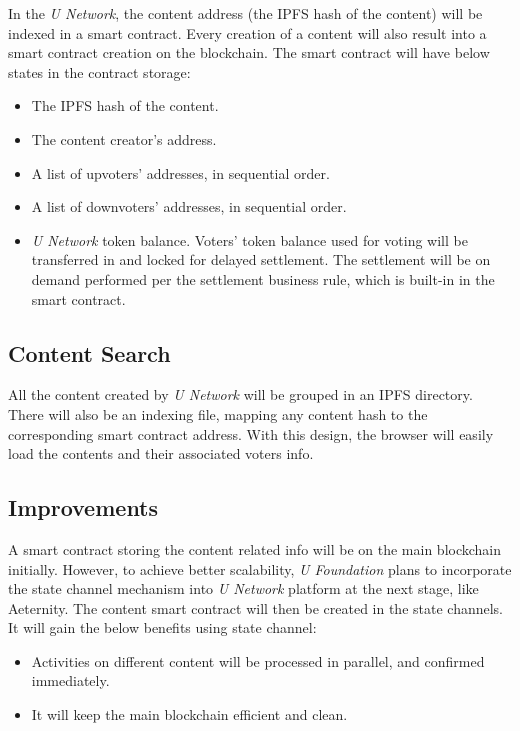 In the \emph{U Network}, the content address (the IPFS hash of the content) will be indexed in a smart contract. Every creation of a content will also result into a smart contract creation on the blockchain. The smart contract will have below states in the contract storage:
\begin{itemize}
\item The IPFS hash of the content.
\item The content creator's address. 
\item A list of upvoters' addresses, in sequential order.
\item A list of downvoters' addresses, in sequential order.
\item \emph{U Network} token balance. Voters' token balance used for voting will be transferred in and locked for delayed settlement. The settlement will be on demand performed per the settlement business rule, which is built-in in the smart contract.
\end{itemize}

\subsection{Content Search}

All the content created by \emph{U Network} will be grouped in an IPFS directory. There will also be an indexing file, mapping any content hash to the corresponding smart contract address. With this design, the browser will easily load the contents and their associated voters info. 

\subsection{Improvements}

A smart contract storing the content related info will be on the main blockchain initially. However, to achieve better scalability, \emph{U Foundation} plans to incorporate the state channel mechanism into \emph{U Network} platform at the next stage, like Aeternity. The content smart contract will then be created in the state channels. It will gain the below benefits using state channel:
\begin{itemize}
\item Activities on different content will be processed in parallel, and confirmed immediately.
\item It will keep the main blockchain efficient and clean.
\end{itemize}


